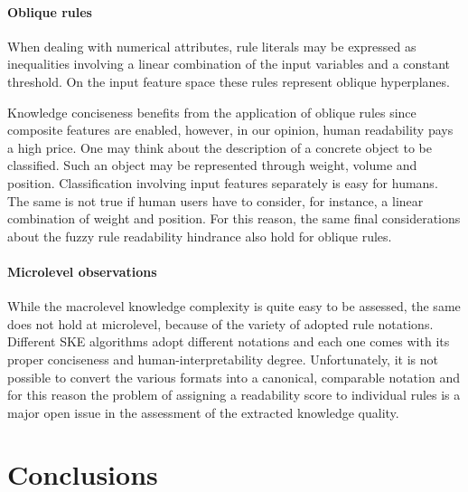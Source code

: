 \documentclass[sigconf]{acmart}
\begin{document}
\paragraph{Oblique rules}

When dealing with numerical attributes, rule literals may be expressed as inequalities involving a linear combination of the input variables and a constant threshold.
%
On the input feature space these rules represent oblique hyperplanes.

Knowledge conciseness benefits from the application of oblique rules since composite features are enabled, however, in our opinion, human readability pays a high price.
%
One may think about the description of a concrete object to be classified.
%
Such an object may be represented through weight, volume and position.
%
Classification involving input features separately is easy for humans.
%
The same is not true if human users have to consider, for instance, a linear combination of weight and position.
%
For this reason, the same final considerations about the fuzzy rule readability hindrance also hold for oblique rules.

\paragraph{Microlevel observations}

While the macrolevel knowledge complexity is quite easy to be assessed, the same does not hold at microlevel, because of the variety of adopted rule notations.
%
Different SKE algorithms adopt different notations and each one comes with its proper conciseness and human-interpretability degree.
%
Unfortunately, it is not possible to convert the various formats into a canonical, comparable notation and for this reason the problem of assigning a readability score to individual rules is a major open issue in the assessment of the extracted knowledge quality.

\section{Conclusions}
\end{document}
